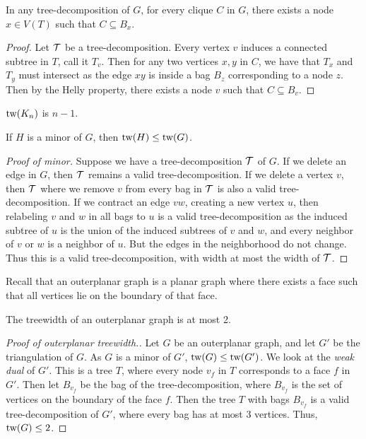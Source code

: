 \begin{theorem}\label{thm:clique}
	In any tree-decomposition of $G$, for every clique $C$ in $G$, there exists a node $x \in V(T)$ such that $C \subseteq B_x$. 
\end{theorem}

\begin{proof}
	Let $\mathcal{T}$ be a tree-decomposition. Every vertex $v$ induces a connected subtree in $T$, call it $T_v$. Then for any two vertices $x, y$ in $C$, we have that $T_x$ and $T_y$ must intersect as the edge $xy$ is inside a bag $B_z$ corresponding to a node $z$. Then by the Helly property, there exists a node $v$ such that $C \subseteq B_v$.
\end{proof}

\begin{corollary}\label{cor:complete_tw}
	$\text{tw}(K_n)$ is $n-1$. 
\end{corollary}

\begin{theorem}\label{thm:tw_minor_closure}
	If $H$ is a minor of $G$, then $\text{tw}(H) \leq \text{tw}(G)$. 
\end{theorem}
\begin{proof}[Proof of minor]
	Suppose we have a tree-decomposition $\mathcal{T}$ of $G$. If we delete an edge in $G$, then $\mathcal{T}$ remains a valid tree-decomposition. If we delete a vertex $v$, then $\mathcal{T}$ where we remove $v$ from every bag in $\mathcal{T}$ is also a valid tree-decomposition. If we contract an edge $vw$, creating a new vertex $u$, then relabeling $v$ and $w$ in all bags to $u$ is a valid tree-decomposition as the induced subtree of $u$ is the union of the induced subtrees of $v$ and $w$, and every neighbor of $v$ or $w$ is a neighbor of $u$. But the edges in the neighborhood do not change. Thus this is a valid tree-decomposition, with width at most the width of $\mathcal{T}$.
\end{proof}

Recall that an outerplanar graph is a planar graph where there exists a face such that all vertices lie on the boundary of that face. 
\begin{example}\label{ex:tw_outerplanar}
	The treewidth of an outerplanar graph is at most 2.
\end{example}
\begin{proof}[Proof of outerplanar treewidth.]
	Let $G$ be an outerplanar graph, and let $G'$ be the triangulation of $G$. As $G$ is a minor of $G'$, $\text{tw}(G) \leq \text{tw}(G')$. We look at the \textit{weak dual} of $G'$. This is a tree $T$, where every node $v_f$ in $T$ corresponds to a face $f$ in $G'$. Then let $B_{v_f}$ be the bag of the tree-decomposition, where $B_{v_f}$ is the set of vertices on the boundary of the face $f$. Then the tree $T$ with bags $B_{v_f}$ is a valid tree-decomposition of $G'$, where every bag has at most 3 vertices. Thus, $\text{tw}(G) \leq 2$. 
\end{proof}


